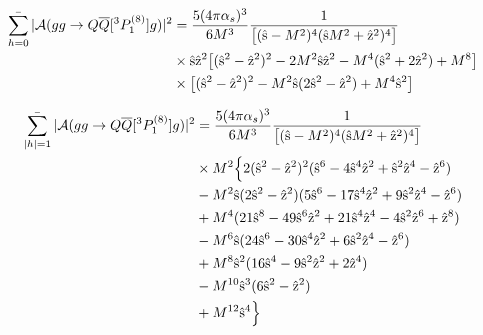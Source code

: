 \documentclass[aps,prc,preprint,superscriptaddress,showpacs,showkeys,amsmath]{revtex4-1}
\begin{document}
\begin{itemize}
\begin{equation}
\begin{split}
\mathop{{\bar{\sum_{h=0}}}} | {\cal A}(gg \to Q{\overline Q}[ ^3P_1^{(8)}] g) |^2 &={5 (4\pi {\alpha_{s}})^3 \over 6 M^3} \frac{1}{\bigl[(\hat{\rm s}-M^2)^4 (\hat{\rm s} M^2 + \hat{\rm z}^2)^4  \bigr]}\\
                                                              & \times \hat{\rm s} \hat{\rm z}^2 \bigl[(\hat{\rm s}^2-\hat{\rm z}^2)^2 - 2 M^2 \hat{\rm s} \hat{\rm z}^2 - M^4 (\hat{\rm s}^2+2 \hat{\rm z}^2) + M^8 \bigr] \\
                                                             & \times \bigl[(\hat{\rm s}^2-\hat{\rm z}^2)^2 - M^2 \hat{\rm s} (2\hat{\rm s}^2 - \hat{\rm z}^2) + M^4 \hat{\rm s}^2 \bigr] 
\end{split}  
\end{equation}

\begin{equation}
\begin{split}
\mathop{{\bar{\sum_{|h|=1}}}} | {\cal A}(gg \to Q{\overline Q}[ ^3P_1^{(8)}] g) |^2 &={5 (4\pi {\alpha_{s}})^3 \over 6 M^3} \frac{1}{\bigl[(\hat{\rm s}-M^2)^4 (\hat{\rm s} M^2 + \hat{\rm z}^2)^4 \bigr]}\\
                                                                & \times M^2 \Bigl\{ 2(\hat{\rm s}^2-\hat{\rm z}^2)^2 (\hat{\rm s}^6-4 \hat{\rm s}^4\hat{\rm z}^2 + \hat{\rm s}^2 \hat{\rm z}^4 - \hat{\rm z}^6) \\
                                                                & - M^2 \hat{\rm s} (2 \hat{\rm s}^2-\hat{\rm z}^2) (5 \hat{\rm s}^6 - 17 \hat{\rm s}^4\hat{\rm z}^2 + 9 \hat{\rm s}^2 \hat{\rm z}^4 - \hat{\rm z}^6 ) \\
                                                                & + M^4 ( 21\hat{\rm s}^8 - 49 \hat{\rm s}^6 \hat{\rm z}^2 + 21 \hat{\rm s}^4 \hat{\rm z}^4 - 4 \hat{\rm s}^2 \hat{\rm z}^6 + \hat{\rm z}^8) \\
                                                                & - M^6 \hat{\rm s} (24 \hat{\rm s}^6 - 30 \hat{\rm s}^4 \hat{\rm z}^2 + 6 \hat{\rm s}^2 \hat{\rm z}^4 - \hat{\rm z}^6) \\
                                                                & + M^8 \hat{\rm s}^2 (16 \hat{\rm s}^4 - 9 \hat{\rm s}^2 \hat{\rm z}^2 + 2 \hat{\rm z}^4)\\
                                                                & - M^{10} \hat{\rm s}^3 (6 \hat{\rm s}^2 - \hat{\rm z}^2) \\
                                                                & + M^{12} \hat{\rm s}^4 \Bigr\} 
\end{split}  
\end{equation}


\end{itemize}
\end{document}
